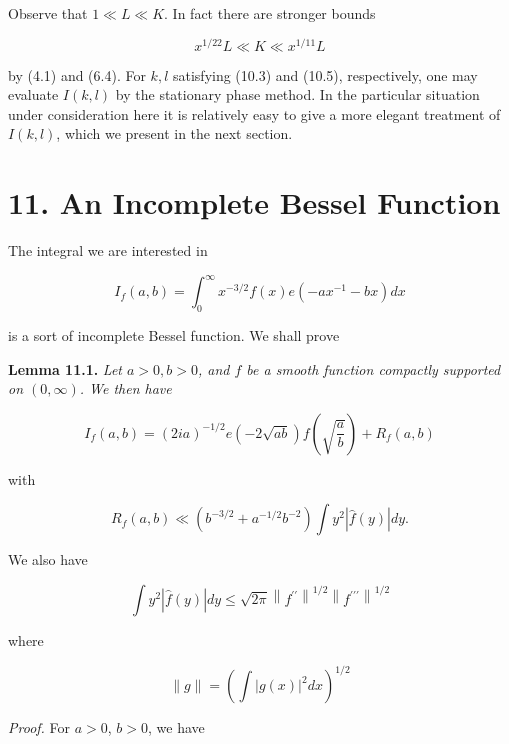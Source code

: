 \documentclass[10pt]{article}
\begin{document}
Observe that $1\ll L\ll K$. In fact there are stronger bounds


\begin{equation*}
x^{1 / 22} L \ll K \ll x^{1 / 11} L \tag{10.7}
\end{equation*}


by (4.1) and (6.4). For $k, l$ satisfying (10.3) and (10.5), respectively, one may evaluate $I(k, l)$ by the stationary phase method. In the particular situation under consideration here it is relatively easy to give a more elegant treatment of $I(k, l)$, which we present in the next section.

\section*{11. An Incomplete Bessel Function}
The integral we are interested in


\begin{equation*}
I_{f}(a, b)=\int_{0}^{\infty} x^{-3 / 2} f(x) e\left(-a x^{-1}-b x\right) d x \tag{11.1}
\end{equation*}


is a sort of incomplete Bessel function. We shall prove

\medskip\noindent\textbf{Lemma 11.1.} \textit{Let $a>0, b>0$, and $f$ be a smooth function compactly supported on $(0, \infty)$. We then have}

\begin{equation*}
I_{f}(a, b)=(2 i a)^{-1 / 2} e(-2 \sqrt{a b}) f\left(\sqrt{\frac{a}{b}}\right)+R_{f}(a, b) \tag{11.2}
\end{equation*}


with


\begin{equation*}
R_{f}(a, b) \ll\left(b^{-3 / 2}+a^{-1 / 2} b^{-2}\right) \int y^{2}|\hat{f}(y)| d y . \tag{11.3}
\end{equation*}


We also have


\begin{equation*}
\int y^{2}|\hat{f}(y)| d y \leqslant \sqrt{2 \pi}\left\|f^{\prime \prime}\right\|^{1 / 2}\left\|f^{\prime \prime \prime}\right\|^{1 / 2} \tag{11.4}
\end{equation*}


where

$$
\|g\|=\left(\int|g(x)|^{2} d x\right)^{1 / 2}
$$

\medskip\noindent\textit{Proof.} For $a>0$, $b>0$, we have
\end{document}
